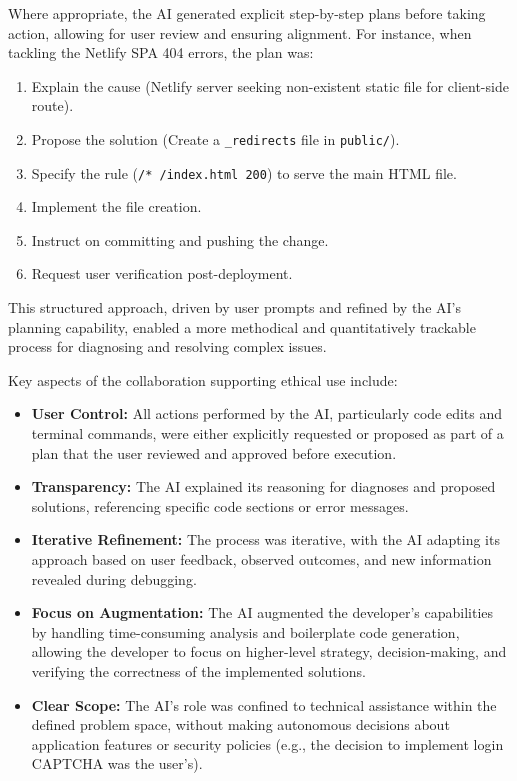 \documentclass[11pt]{article} %
\begin{document}
Where appropriate, the AI generated explicit step-by-step plans before taking action, allowing for user review and ensuring alignment. For instance, when tackling the Netlify SPA 404 errors, the plan was:
\begin{enumerate}
    \item Explain the cause (Netlify server seeking non-existent static file for client-side route).
    \item Propose the solution (Create a \texttt{\_redirects} file in \texttt{public/}).
    \item Specify the rule (\texttt{/* /index.html 200}) to serve the main HTML file.
    \item Implement the file creation.
    \item Instruct on committing and pushing the change.
    \item Request user verification post-deployment.
\end{enumerate}
This structured approach, driven by user prompts and refined by the AI's planning capability, enabled a more methodical and quantitatively trackable process for diagnosing and resolving complex issues.

Key aspects of the collaboration supporting ethical use include:
\begin{itemize}
    \item \textbf{User Control:} All actions performed by the AI, particularly code edits and terminal commands, were either explicitly requested or proposed as part of a plan that the user reviewed and approved before execution.
    \item \textbf{Transparency:} The AI explained its reasoning for diagnoses and proposed solutions, referencing specific code sections or error messages.
    \item \textbf{Iterative Refinement:} The process was iterative, with the AI adapting its approach based on user feedback, observed outcomes, and new information revealed during debugging.
    \item \textbf{Focus on Augmentation:} The AI augmented the developer's capabilities by handling time-consuming analysis and boilerplate code generation, allowing the developer to focus on higher-level strategy, decision-making, and verifying the correctness of the implemented solutions.
    \item \textbf{Clear Scope:} The AI's role was confined to technical assistance within the defined problem space, without making autonomous decisions about application features or security policies (e.g., the decision to implement login CAPTCHA was the user's).
\end{itemize}
\end{document}

